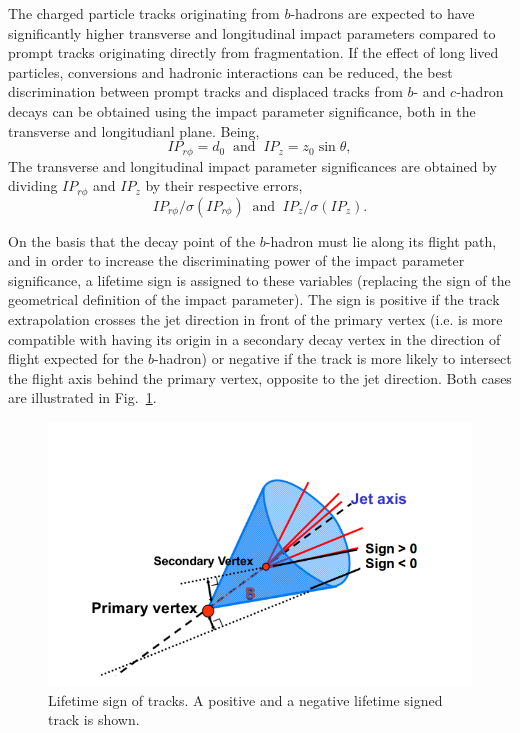 The charged particle tracks originating from $b$-hadrons are expected to have significantly higher transverse and longitudinal impact parameters compared to prompt tracks originating directly from fragmentation. If the effect of long lived particles, conversions and hadronic interactions can be reduced, the best discrimination between prompt tracks and displaced tracks from $b$- and $c$-hadron decays can be obtained using the impact parameter significance, both in the transverse and longitudianl plane. Being,
\begin{equation}
    IP_{r\phi} = d_0\;\;  \text{and} \;\;  IP_{z} = z_0 \sin \theta,
\end{equation}
The transverse and longitudinal impact parameter significances are obtained by dividing $IP_{r\phi}$ and $IP_z$ by their respective errors,
\begin{equation}
    IP_{r\phi}/\sigma(IP_{r\phi})\;\; \text{and} \;\;  IP_{z}/\sigma(IP_{z}).
\end{equation}
%

On the basis that the decay point of the $b$-hadron must lie along its flight path, and in order to increase the discriminating power of the impact parameter significance, a lifetime sign is assigned to these variables (replacing the sign of the geometrical definition of the impact parameter). The sign is positive if the track extrapolation crosses the jet direction in front of the primary vertex (i.e. is more compatible with having its origin in a secondary decay vertex in the direction of flight expected for the $b$-hadron) or negative if the track is more likely to intersect the flight axis behind the primary vertex, opposite to the jet direction. Both cases are illustrated in Fig.~\ref{fig:signedIP}. 

\begin{figure}[htbp]
  \begin{center}
      \includegraphics[width=1\textwidth]{signedFinal.png}
    \caption{Lifetime sign of tracks. A positive and a negative lifetime signed track is shown.}
    \label{fig:signedIP}
  \end{center}
\end{figure}

